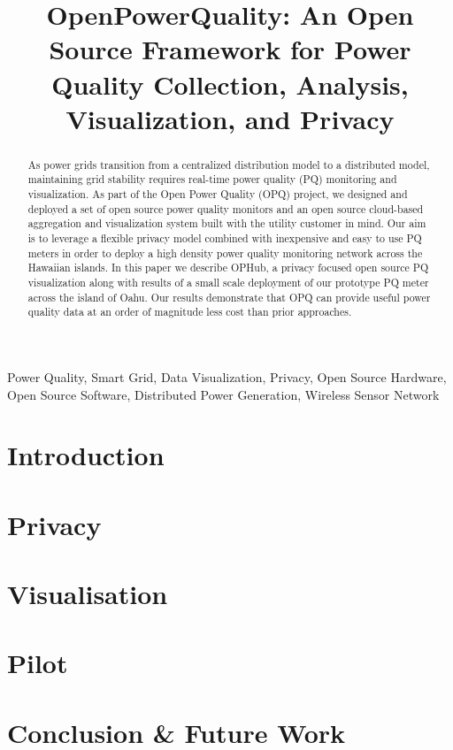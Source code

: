 \documentclass[conference]{IEEEtran}
\begin{document}
\title{OpenPowerQuality: An Open Source Framework for Power Quality Collection, Analysis, Visualization, and Privacy}

\author{
}

\maketitle

\begin{abstract}
As power grids transition from a centralized distribution model to a distributed model, maintaining grid stability requires real-time power quality (PQ) monitoring and visualization.  As part of the Open Power Quality (OPQ) project, we designed and deployed a set of open source power quality monitors and an open source cloud-based aggregation and visualization system built with the utility customer in mind. Our aim is to leverage a flexible privacy model combined with inexpensive and easy to use PQ meters in order to deploy a high density power quality monitoring network across the Hawaiian islands. In this paper we describe OPHub, a privacy focused open source PQ visualization along with results of a small scale deployment of our prototype PQ meter across the island of Oahu. Our results demonstrate that OPQ can provide useful power quality data at an order of magnitude less cost than prior approaches.
\end{abstract}

\begin{IEEEkeywords}
Power Quality, Smart Grid, Data Visualization, Privacy, Open Source Hardware, Open Source Software, Distributed Power Generation, Wireless Sensor Network
\end{IEEEkeywords}

\IEEEpeerreviewmaketitle

\section{Introduction}


\section{Privacy}


\section{Visualisation}


\section{Pilot}


\section{Conclusion \& Future Work}




\end{document}
